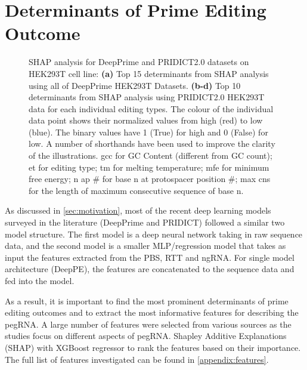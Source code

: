 \section{Determinants of Prime Editing Outcome}
\label{sec:determinants}

\begin{figure}
    \centering
    \caption[SHAP analysis for DeepPrime and PRIDICT2.0 datasets on HEK293T cell line.]{SHAP analysis for DeepPrime and PRIDICT2.0 datasets on HEK293T cell line: \textbf{(a)} Top 15 determinants from SHAP analysis using all of DeepPrime HEK293T Datasets. \textbf{(b-d)} Top 10 determinants from SHAP analysis using PRIDICT2.0 HEK293T data for each individual editing types. The colour of the individual data point shows their normalized values from high (red) to low (blue). The binary values have 1 (True) for high and 0 (False) for low. A number of shorthands have been used to improve the clarity of the illustrations. gcc for GC Content (different from GC count); et for editing type; tm for melting temperature; mfe for minimum free energy; n ap \# for base n at protospacer position \#; max cns for the length of maximum consecutive sequence of base n.} 
    \label{fig:shap}
\end{figure}

As discussed in \autoref{sec:motivation}, most of the recent deep learning models surveyed in the literature (DeepPrime\cite{yuPredictionEfficienciesDiverse2023} and PRIDICT\cite{mathisPredictingPrimeEditing2023,mathisMachineLearningPrediction2024}) followed a similar two model structure. The first model is a deep neural network taking in raw sequence data, and the second model is a smaller MLP/regression model that takes as input the features extracted from the PBS, RTT and ngRNA. For single model architecture (DeepPE\cite{kimPredictingEfficiencyPrime2021}), the features are concatenated to the sequence data and fed into the model.

As a result, it is important to find the most prominent determinants of prime editing outcomes and to extract the most informative features for describing the pegRNA. A large number of features were selected from various sources as the studies focus on different aspects of pegRNA. Shapley Additive Explanations (SHAP) with XGBoost regressor to rank the features based on their importance. The full list of features investigated can be found in \autoref{appendix:features}. 

